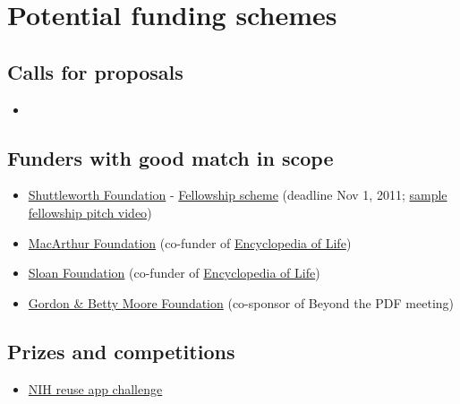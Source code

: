 \documentclass[final,authoryear,3p]{elsarticle-open-drafting}
\begin{document}
\section{Potential funding schemes}
\subsection{Calls for proposals}
\begin{itemize}
	\item 
\end{itemize}
\subsection{Funders with good match in scope}
\begin{itemize}
	\item \href{http://www.shuttleworthfoundation.org/}{Shuttleworth Foundation} - \href{http://www.shuttleworthfoundation.org/funding/fellowship-programme/}{Fellowship scheme} (deadline Nov 1, 2011; \href{http://vimeo.com/10401282}{sample fellowship pitch video})
	\item \href{http://www.macfound.org}{MacArthur Foundation} (co-funder of \href{http://www.eol.org/}{Encyclopedia of Life})
	\item \href{http://www.sloan.org/}{Sloan Foundation} (co-funder of \href{http://www.eol.org/}{Encyclopedia of Life})
	\item \href{http://www.moore.org/}{Gordon \& Betty Moore Foundation} (co-sponsor of Beyond the PDF meeting)
\end{itemize}
\subsection{Prizes and competitions}
\begin{itemize}
	\item \href{http://challenge.gov/NIH/132-nlm-show-off-your-apps-innovative-uses-of-nlm-information}{NIH reuse app challenge}
\end{itemize}
\end{document}
